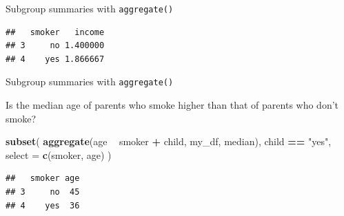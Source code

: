 \documentclass[ignorenonframetext,]{beamer}
\newenvironment{Shaded}{\begin{snugshade}}{\end{snugshade}}
\newcommand{\DataTypeTok}[1]{\textcolor[rgb]{0.13,0.29,0.53}{#1}}
\newcommand{\KeywordTok}[1]{\textcolor[rgb]{0.13,0.29,0.53}{\textbf{#1}}}
\newcommand{\NormalTok}[1]{#1}
\newcommand{\OperatorTok}[1]{\textcolor[rgb]{0.81,0.36,0.00}{\textbf{#1}}}
\newcommand{\StringTok}[1]{\textcolor[rgb]{0.31,0.60,0.02}{#1}}
\begin{document}
\begin{frame}[fragile]{Subgroup summaries with \texttt{aggregate()}}
\protect\hypertarget{subgroup-summaries-with-aggregate-22}{}

\begin{Shaded}
\end{Shaded}

\begin{verbatim}
##   smoker   income
## 3     no 1.400000
## 4    yes 1.866667
\end{verbatim}

\end{frame}

\begin{frame}[fragile]{Subgroup summaries with \texttt{aggregate()}}
\protect\hypertarget{subgroup-summaries-with-aggregate-23}{}

Is the median age of parents who smoke higher than that of parents who
don't smoke?

\begin{Shaded}
\begin{Highlighting}[]
\KeywordTok{subset}\NormalTok{(}
  \KeywordTok{aggregate}\NormalTok{(age }\OperatorTok{~}\StringTok{ }\NormalTok{smoker }\OperatorTok{+}\StringTok{ }\NormalTok{child, my_df, median),}
\NormalTok{  child }\OperatorTok{==}\StringTok{ "yes"}\NormalTok{,}
  \DataTypeTok{select =} \KeywordTok{c}\NormalTok{(smoker, age)}
\NormalTok{  )}
\end{Highlighting}
\end{Shaded}

\begin{verbatim}
##   smoker age
## 3     no  45
## 4    yes  36
\end{verbatim}

\end{frame}
\end{document}

